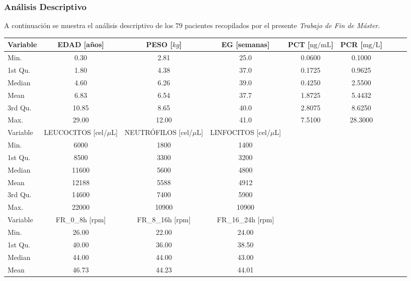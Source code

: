 \newpage
\thispagestyle{empty}
\begin{landscape}
    \subsubsection{Análisis Descriptivo}\label{sec:transformaciones-de-datos}

A continuación se muestra el análisis descriptivo de los $79$ pacientes recopilados por el presente \textit{Trabajo de Fin de Máster}. 
    \begin{table}[h]
        \centering
        \begin{tabular}{lcccccccc}
        \hline
        Variable & EDAD [años] & PESO [$kg$] & EG [semanas] & PCT [$ \text{ng/mL} $] & PCR [$ \text{mg/L} $] \\ \hline
        Min. & 0.30 & 2.81 & 25.0 & 0.0600 & 0.1000 \\
        1st Qu. & 1.80 & 4.38 & 37.0 & 0.1725 & 0.9625 \\
        Median & 4.60 & 6.26 & 39.0 & 0.4250 & 2.5500 \\
        Mean & 6.83 & 6.54 & 37.7 & 1.8725 & 5.4432 \\
        3rd Qu. & 10.85 & 8.65 & 40.0 & 2.8075 & 8.6250 \\
        Max. & 29.00 & 12.00 & 41.0 & 7.5100 & 28.3000 \\ \hline
        Variable & LEUCOCITOS [cel/$\mu$L] & NEUTRÓFILOS [cel/$\mu$L] & LINFOCITOS [cel/$\mu$L] \\ \hline
        Min. & 6000 & 1800 & 1400 \\
        1st Qu. & 8500 & 3300 & 3200 \\
        Median & 11600 & 5600 & 4800 \\
        Mean & 12188 & 5588 & 4912 \\
        3rd Qu. & 14600 & 7400 & 5900 \\
        Max. & 22000 & 10900 & 10900 \\ \hline
        Variable & FR\_0\_8h [rpm] & FR\_8\_16h [rpm] & FR\_16\_24h [rpm] \\ \hline
        Min. & 26.00 & 22.00 & 24.00 \\
        1st Qu. & 40.00 & 36.00 & 38.50 \\
        Median & 44.00 & 44.00 & 43.00 \\
        Mean & 46.73 & 44.23 & 44.01 \\

\end{tabular}
\end{table}
\end{landscape}

